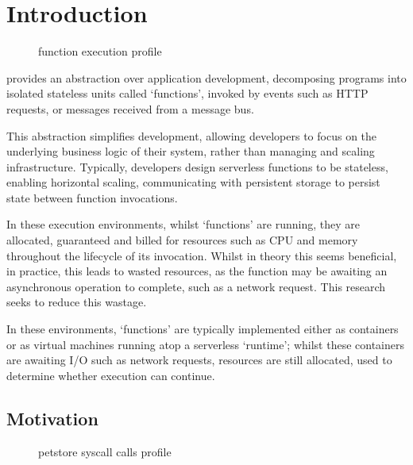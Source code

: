 \chapter{Introduction}

\begin{figure}
    \begin{center}
        
    \end{center}
    \caption{\faas{} function execution profile}
    \label{fig:faas-profile-intro-experiment}
\end{figure}

\faasxlong{} provides an abstraction over application development, decomposing programs into isolated stateless units called `functions', invoked by events such as HTTP requests, or messages received from a message bus\cite{ibmWhatFaaSFunctionasaService2024}.

This abstraction simplifies development, allowing developers to focus on the underlying business logic of their system, rather than managing and scaling infrastructure. Typically, developers design serverless functions to be stateless\cite{ggailey777AzureFunctionsBest2022}, enabling horizontal scaling\cite{ngoEvaluatingScalabilityElasticity2022}, communicating with persistent storage to persist state between function invocations.

In these execution environments, whilst `functions' are running, they are allocated, guaranteed and billed for resources such as CPU and memory throughout the lifecycle of its invocation. Whilst in theory this seems beneficial, in practice, this leads to wasted resources, as the function may be awaiting an asynchronous operation to complete, such as a network request. This research seeks to reduce this wastage.

In these environments, `functions' are typically implemented either as containers or as virtual machines running atop a serverless `runtime'; whilst these containers are awaiting I/O such as network requests, resources are still allocated, used to determine whether execution can continue.

\section{Motivation}
\begin{figure}
    \begin{center}
        
    \end{center}
    \caption{\faas{} petstore syscall calls profile}
    \label{fig:faas-strace-freq-intro-experiment}
\end{figure}

